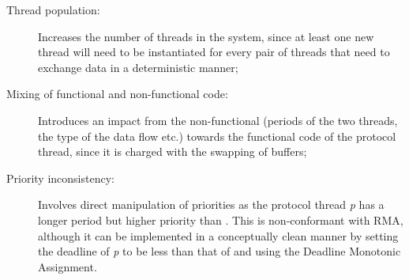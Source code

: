 \begin{description}
\item[Thread population:]{Increases the number of threads in the
  system, since at least one new thread will need to be instantiated
  for every pair of threads that need to exchange data in a
  deterministic manner;}
\item[Mixing of functional and non-functional code:]{Introduces an
  impact from the non-functional (periods of the two threads, the type
  of the data flow etc.) towards the functional code of the protocol
  thread, since it is charged with the swapping of buffers;}
\item[Priority inconsistency:]{Involves direct manipulation of
  priorities as the protocol thread \emph{p} has a longer period but
  higher priority than \ts. This is non-conformant with RMA, although
  it can be implemented in a conceptually clean manner by setting the
  deadline of \emph{p} to be less than that of \ts and using the
  Deadline Monotonic Assignment.}
\end{description}

